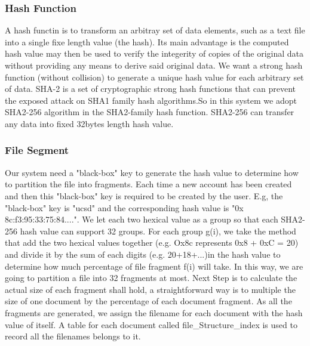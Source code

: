 \subsubsection{Hash Function}
A hash functin is to transform an arbitray set of data elements, such as a text file into a single fixe length value (the hash). Its main advantage is the computed hash value may then be used to verify the integerity of copies of the original data without providing any means to derive said original data. We want a strong hash function (without collision) to generate a unique hash value for each arbitrary set of data. SHA-2 is a set of cryptographic strong hash functions that can prevent the exposed attack on SHA1 family hash algorithms.So in this system we adopt SHA2-256 algorithm in the SHA2-family hash function. SHA2-256 can transfer any data into fixed 32bytes length hash value.

\subsubsection{File Segment}
Our system need a "black-box" key to generate the hash value to determine how to partition the file into fragments. Each time a new account has been created and then this "black-box" key is required to be created by the user. E.g, the "black-box" key is "ucsd" and the corresponding hash value is "0x 8c:f3:95:33:75:84....". We let each two hexical value as a group so that each SHA2-256 hash value can support 32 groups. For each group g(i), we take the method that add the two hexical values together (e.g. Ox8c represents 0x8 + 0xC = 20) and divide it by the sum of each digits (e.g. 20+18+...)in the hash value to determine how much percentage of file fragment f(i) will take. In this way, we are going to partition a file into 32 fragments at most. Next Step is to calculate the actual size of each fragment shall hold, a straightforward way is to multiple the size of one document by the percentage of each document fragment. As all the fragments are generated, we assign the filename for each document with the hash value of itself. A table for each document called file\_Structure\_index is used to record all the filenames belongs to it.   




